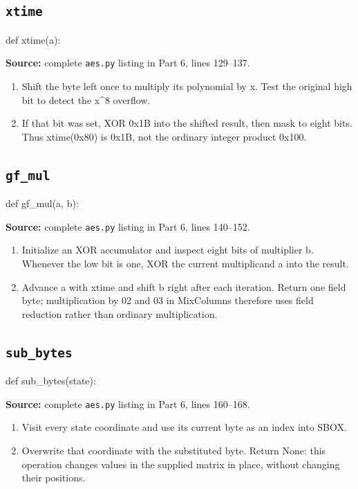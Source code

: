\subsection{\texttt{xtime}}
\begin{lightcode}
def xtime(a):
\end{lightcode}
\noindent\textbf{Source:} complete \texttt{aes.py} listing in Part 6, lines 129--137.
\begin{enumerate}
\item Shift the byte left once to multiply its polynomial by x. Test the original high bit to detect the x\textasciicircum{}8 overflow.
\item If that bit was set, XOR 0x1B into the shifted result, then mask to eight bits. Thus xtime(0x80) is 0x1B, not the ordinary integer product 0x100.
\end{enumerate}
\subsection{\texttt{gf\_\allowbreak{}mul}}
\begin{lightcode}
def gf_mul(a, b):
\end{lightcode}
\noindent\textbf{Source:} complete \texttt{aes.py} listing in Part 6, lines 140--152.
\begin{enumerate}
\item Initialize an XOR accumulator and inspect eight bits of multiplier b. Whenever the low bit is one, XOR the current multiplicand a into the result.
\item Advance a with xtime and shift b right after each iteration. Return one field byte; multiplication by 02 and 03 in MixColumns therefore uses field reduction rather than ordinary multiplication.
\end{enumerate}
\subsection{\texttt{sub\_\allowbreak{}bytes}}
\begin{lightcode}
def sub_bytes(state):
\end{lightcode}
\noindent\textbf{Source:} complete \texttt{aes.py} listing in Part 6, lines 160--168.
\begin{enumerate}
\item Visit every state coordinate and use its current byte as an index into SBOX.
\item Overwrite that coordinate with the substituted byte. Return None: this operation changes values in the supplied matrix in place, without changing their positions.
\end{enumerate}
